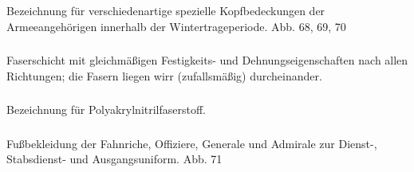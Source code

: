 \subsubsection*{}%

Bezeichnung für verschiedenartige spezielle Kopfbedeckungen der Armeeangehörigen innerhalb der Wintertrageperiode. Abb. 68, 69, 70

\subsubsection*{}%

Faserschicht mit gleichmäßigen Festigkeits- und Dehnungseigenschaften nach allen Richtungen; die Fasern liegen wirr (zufallsmäßig) durcheinander.

\subsubsection*{}%

Bezeichnung für Polyakrylnitrilfaserstoff.

\subsubsection*{}%

Fußbekleidung der Fahnriche, Offiziere, Generale und Admirale zur Dienst-, Stabsdienst- und Ausgangsuniform. Abb. 71